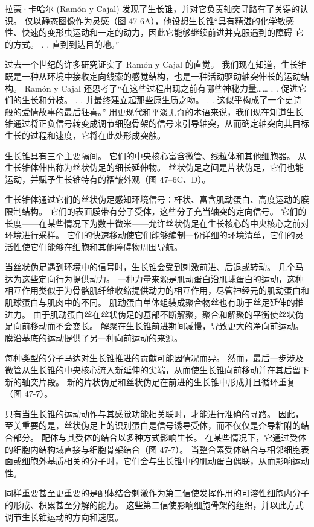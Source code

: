 拉蒙·卡哈尔 (Ramón y Cajal) 发现了生长锥，并对它负责轴突寻路有了关键的认识。 仅以静态图像作为灵感（图 47-6A），他设想生长锥“具有精湛的化学敏感性、快速的变形虫运动和一定的动力，因此它能够继续前进并克服遇到的障碍 它的方式。 . . 直到到达目的地。”

过去一个世纪的许多研究证实了 Ramón y Cajal 的直觉。 我们现在知道，生长锥既是一种从环境中接收定向线索的感觉结构，也是一种活动驱动轴突伸长的运动结构。 Ramón y Cajal 还思考了“在这些过程出现之前有哪些神秘力量…… . . 促进它们的生长和分枝。 . . 并最终建立起那些原生质之吻。 . . 这似乎构成了一个史诗般的爱情故事的最后狂喜。” 用更现代和平淡无奇的术语来说，我们现在知道生长锥通过将正负信号转变成调节细胞骨架的信号来引导轴突，从而确定轴突向其目标生长的过程和速度，它将在此处形成突触。

生长锥具有三个主要隔间。 它们的中央核心富含微管、线粒体和其他细胞器。 从生长锥体伸出称为丝状伪足的细长延伸物。 丝状伪足之间是片状伪足，它们也能运动，并赋予生长锥特有的褶皱外观（图 47–6C、D）。

生长锥体通过它们的丝状伪足感知环境信号：杆状、富含肌动蛋白、高度运动的膜限制结构。 它们的表面膜带有分子受体，这些分子充当轴突的定向信号。 它们的长度——在某些情况下为数十微米——允许丝状伪足在生长核心的中央核心之前对环境进行采样。 它们的快速移动使它们能够编制一份详细的环境清单，它们的灵活性使它们能够在细胞和其他障碍物周围导航。

当丝状伪足遇到环境中的信号时，生长锥会受到刺激前进、后退或转动。 几个马达为这些定向行为提供动力。 一种力量来源是肌动蛋白沿肌球蛋白的运动，这种相互作用类似于为骨骼肌纤维收缩提供动力的相互作用，尽管神经元的肌动蛋白和肌球蛋白与肌肉中的不同。 肌动蛋白单体组装成聚合物丝也有助于丝足延伸的推进力。 由于肌动蛋白丝在丝状伪足的基部不断解聚，聚合和解聚的平衡使丝状伪足向前移动而不会变长。 解聚在生长锥前进期间减慢，导致更大的净向前运动。 膜沿基底的运动提供了另一种向前运动的来源。

每种类型的分子马达对生长锥推进的贡献可能因情况而异。 然而，最后一步涉及微管从生长锥的中央核心流入新延伸的尖端，从而使生长锥向前移动并在其后留下新的轴突片段。 新的片状伪足和丝状伪足在前进的生长锥中形成并且循环重复（图 47-7）。

只有当生长锥的运动动作与其感觉功能相关联时，才能进行准确的寻路。 因此，至关重要的是，丝状伪足上的识别蛋白是信号诱导受体，而不仅仅是介导粘附的结合部分。 配体与其受体的结合以多种方式影响生长。 在某些情况下，它通过受体的细胞内结构域直接与细胞骨架结合（图 47-7）。 当整合素受体结合与相邻细胞表面或细胞外基质相关的分子时，它们会与生长锥中的肌动蛋白偶联，从而影响运动性。

同样重要甚至更重要的是配体结合刺激作为第二信使发挥作用的可溶性细胞内分子的形成、积累甚至分解的能力。 这些第二信使影响细胞骨架的组织，并以此方式调节生长锥运动的方向和速度。

